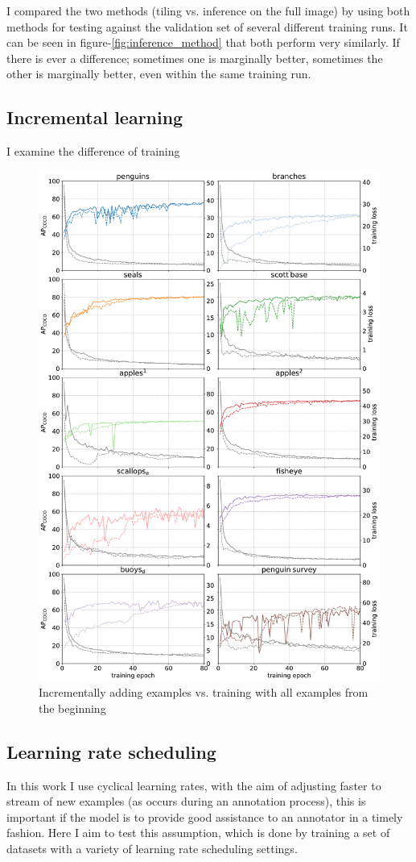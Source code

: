 I compared the two methods (tiling vs. inference on the full image) by using both methods for testing against the validation set of several different training runs. It can be seen in figure-\ref{fig:inference_method} that both perform very similarly. If there is ever a difference; sometimes one is marginally better, sometimes the other is marginally better, even within the same training run.

\subsection{Incremental learning}
\label{sec:lr_schedule_exp}

I examine the difference of training 

\begin{figure}[h]
  \centering
  \includegraphics[height=0.9\linewidth]{charts/training/incremental.pdf}
  \caption{Incrementally adding examples vs. training with all examples from the beginning}  
  \label{fig:incremental}
\end{figure}


\subsection {Learning rate scheduling}
\label{sec:lr_schedule_exp}

In this work I use cyclical learning rates, with the aim of adjusting faster to stream of new examples (as occurs during an annotation process), this is important if the model is to provide good assistance to an annotator in a timely fashion. Here I aim to test this assumption, which is done by training a set of datasets with a variety of learning rate scheduling settings. 

